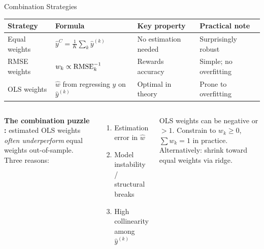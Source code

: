 \documentclass[aspectratio=169, 11pt]{beamer}
\begin{document}
\begin{frame}{Combination Strategies}
  \begin{center}
    {\small
    \begin{tabular}{llll}
      \toprule
      \textbf{Strategy} & \textbf{Formula} & \textbf{Key property}
                        & \textbf{Practical note} \\
      \midrule
      Equal weights
        & $\hat{y}^C = \frac{1}{K}\sum_k \hat{y}^{(k)}$
        & No estimation needed
        & Surprisingly robust \\
      RMSE weights
        & $w_k \propto \operatorname{RMSE}_k^{-1}$
        & Rewards accuracy
        & Simple; no overfitting \\
      OLS weights
        & $\hat{w}$ from regressing $y$ on $\hat{y}^{(k)}$
        & Optimal in theory
        & Prone to overfitting \\
      \bottomrule
    \end{tabular}
    }
  \end{center}
  \begin{columns}[T]
      \textbf{The combination puzzle \parencite{Timmermann2006,StockWatson2004}:}
      estimated OLS weights \emph{often underperform} equal weights
      out-of-sample. Three reasons:
      \begin{enumerate}\footnotesize
        \item Estimation error in $\hat{w}$
        \item Model instability / structural breaks
        \item High collinearity among $\hat{y}^{(k)}$
      \end{enumerate}
      \begin{warningbox}
        {\small OLS weights can be negative or $>1$.
        Constrain to $w_k \geq 0$, $\sum w_k = 1$
        in practice. Alternatively: shrink toward
        equal weights via ridge.}
      \end{warningbox}
  \end{columns}
\end{frame}
\end{document}
